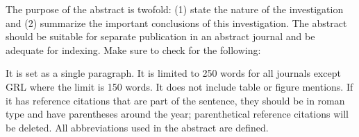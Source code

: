 The purpose of the abstract is twofold: (1) state the nature of the investigation and (2) summarize the important conclusions of this investigation. The abstract should be suitable for separate publication in an abstract journal and be adequate for indexing. Make sure to check for the following:

    It is set as a single paragraph.
    It is limited to 250 words for all journals except GRL where the limit is 150 words.
    It does not include table or figure mentions.
    If it has reference citations that are part of the sentence, they should be in roman type and have parentheses around the year; parenthetical reference citations will be deleted.
    All abbreviations used in the abstract are defined.
\pagebreak

  
  
  
  